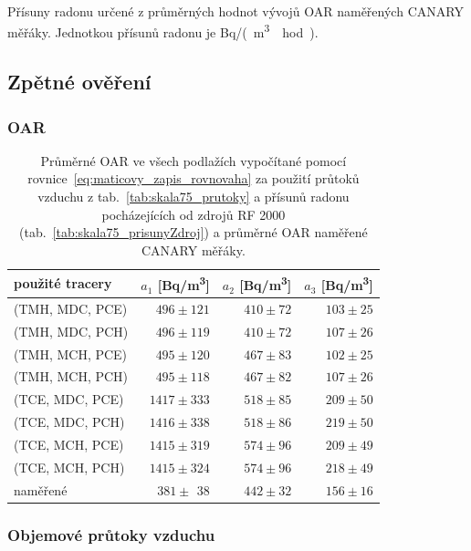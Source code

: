 \begin{table}[ht]
    \centering
    \caption{Přísuny radonu určené z průměrných hodnot vývojů OAR naměřených CANARY měřáky. Jednotkou přísunů radonu je \si{Bq/(m^3\cdot hod)}.}
    \label{tab:skala75_prisunyRovnovazneCANARY}
   
\end{table}

\subsection{Zpětné ověření}

\subsubsection{OAR}
\begin{table}[H]
    \small
    \centering
    \caption{\small Průměrné OAR ve všech podlažích vypočítané pomocí rovnice~\eqref{eq:maticovy_zapis_rovnovaha} za použití průtoků vzduchu z tab.~\ref{tab:skala75_prutoky} a přísunů radonu pocházejících od zdrojů RF 2000 (tab.~\ref{tab:skala75_prisunyZdroj}) a průměrné OAR naměřené CANARY měřáky.}
    \label{tab:skala75_OAR_zpetne}
    \begin{tabular}{lrrr}
        \toprule
  použité tracery  & $a_1$ [\si{Bq/m^3}] &  $a_2$ [\si{Bq/m^3}]& $a_3$ [\si{Bq/m^3}] \\
        \midrule
(TMH, MDC, PCE) & $ 496\pm121$ & $410\pm72$ & $103\pm25$ \\
(TMH, MDC, PCH) & $ 496\pm119$ & $410\pm72$ & $107\pm26$ \\
(TMH, MCH, PCE) & $ 495\pm120$ & $467\pm83$ & $102\pm25$ \\
(TMH, MCH, PCH) & $ 495\pm118$ & $467\pm82$ & $107\pm26$ \\
(TCE, MDC, PCE) & $1417\pm333$ & $518\pm85$ & $209\pm50$ \\
(TCE, MDC, PCH) & $1416\pm338$ & $518\pm86$ & $219\pm50$ \\
(TCE, MCH, PCE) & $1415\pm319$ & $574\pm96$ & $209\pm49$ \\
(TCE, MCH, PCH) & $1415\pm324$ & $574\pm96$ & $218\pm49$ \\
\midrule
       naměřené & $381\pm\ \,38$ & $442\pm32$ & $156\pm16$ \\
        \bottomrule
    \end{tabular}
\end{table}

\subsubsection{Objemové průtoky vzduchu}

